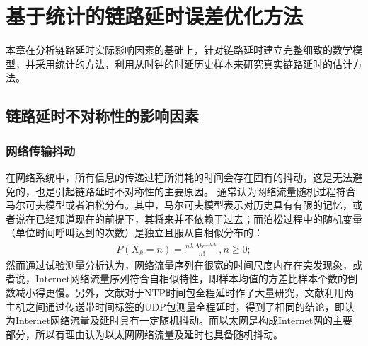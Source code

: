 
\chapter{基于统计的链路延时误差优化方法}
\label{chap:statistical_delay}
本章在分析链路延时实际影响因素的基础上，针对链路延时建立完整细致的数学模型，并采用统计的方法，利用从时钟的时延历史样本来研究真实链路延时的估计方法。

\section{链路延时不对称性的影响因素}

\subsection{网络传输抖动}
在网络系统中，所有信息的传递过程所消耗的时间会存在固有的抖动，这是无法避免的，也是引起链路延时不对称性的主要原因。
通常认为网络流量随机过程符合马尔可夫模型或者泊松分布。其中，马尔可夫模型表示对历史具有有限的记忆，或者说在已经知道现在的前提下，其将来并不依赖于过去；而泊松过程中的随机变量（单位时间呼叫达到的次数）是独立且服从自相似分布的\supercite{12}：
\begin {align}
P(X_{k} = n) = \frac{n\lambda\Delta t e^{- \lambda\Delta t}}{n!},n\geq 0;
\end{align}
然而通过试验测量分析认为，网络流量序列在很宽的时间尺度内存在突发现象，或者说，Internet网络流量序列符合自相似特性\supercite{13,14,15,16}，即样本均值的方差比样本个数的倒数减小得更慢。另外，文献\parencite{17}对于NTP时间包全程延时作了大量研究，文献\parencite{18}利用两主机之间通过传送带时间标签的UDP包测量全程延时，得到了相同的结论，即认为Internet网络流量及延时具有一定随机抖动。而以太网是构成Internet网的主要部分，所以有理由认为以太网网络流量及延时也具备随机抖动。


